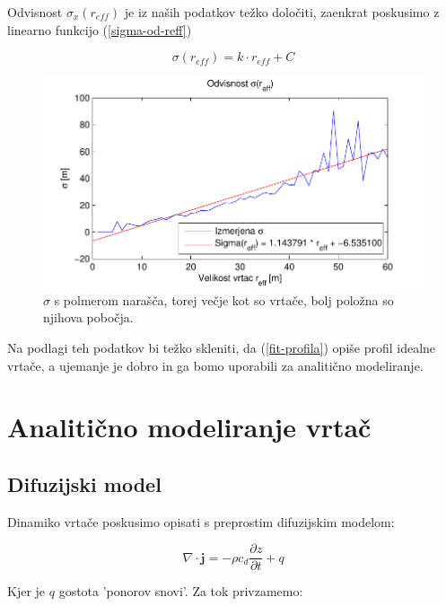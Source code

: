 \documentclass[a4paper, oneside, 12pt]{book}
\begin{document}
Odvisnost $\sigma_x(r_{eff})$ je iz naših podatkov težko določiti, zaenkrat poskusimo z linearno funkcijo (\ref{sigma-od-reff})


\begin{equation}
  \sigma (r_{eff}) = k \cdot r_{eff} + C
  \label{sigma-od-reff}
\end{equation}

\begin{figure}[H]
  \centering
  \includegraphics{slike/menisija-sigme}
  \caption{$\sigma$ s polmerom narašča, torej večje kot so vrtače, bolj položna so njihova pobočja.}
  \label{fig:menisija-sigma}
\end{figure}

Na podlagi teh podatkov bi težko skleniti, da (\ref{fit-profila}) opiše profil idealne vrtače, a ujemanje je dobro in ga bomo uporabili za analitično modeliranje. 


\chapter{Analitično modeliranje vrtač}
\label{analiticno-modeliranje}

\section{Difuzijski model}

Dinamiko vrtače poskusimo opisati s preprostim difuzijskim modelom:

\begin{equation}
  \nabla \cdot \mathbf{j} = - \rho c_d \frac{\partial z}{\partial t} + q
  \label{kontinuitetna-enacba-1}
\end{equation}

Kjer je $q$ gostota 'ponorov snovi'. Za tok privzamemo:
\end{document}
